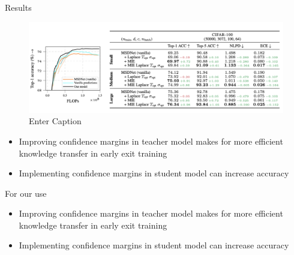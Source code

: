 \begin{frame}{Results}

    \begin{figure}
        \centering
        \includegraphics[width=0.8\linewidth]{Screenshot 2025-04-08 at 15.40.28.png}
        \caption{Enter Caption}
        \label{fig:enter-label}
    \end{figure}
    \begin{itemize}
        \item Improving confidence margins in teacher model makes for more efficient knowledge transfer in early exit training
        \item Implementing confidence margins in student model can increase accuracy

    \end{itemize}
\end{frame}

\begin{frame}{For our use}
    \begin{itemize}
        \item Improving confidence margins in teacher model makes for more efficient knowledge transfer in early exit training
        \item Implementing confidence margins in student model can increase accuracy

    \end{itemize}
\end{frame}